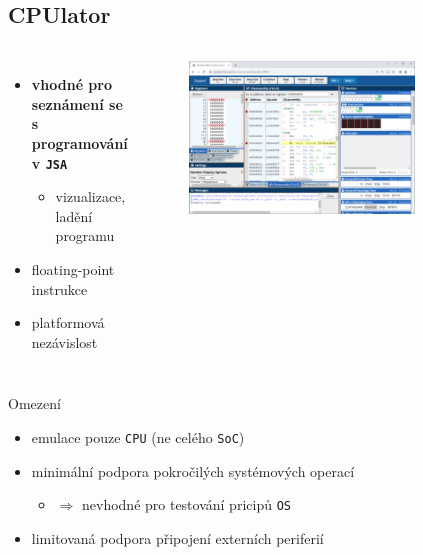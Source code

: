 \documentclass[compress]{beamer}
\begin{document}
\subsection{CPUlator}

\begin{frame}
	\begin{columns}
		\begin{itemize}
			\item \textbf{vhodné pro seznámení se s programování v \texttt{JSA}}
			\begin{itemize}
				\item vizualizace, ladění programu
			\end{itemize}
			\item floating-point instrukce
			\item platformová nezávislost
		\end{itemize}
		\begin{figure}
			\centering
			\includegraphics[width=0.8\textwidth]{img/cpulator.png}
			\caption{\href{https://cpulator.01xz.net}{}}
			\label{CPUlator}
		\end{figure}
	\end{columns}
	\noindent\makebox[\linewidth]{\rule{\textwidth}{0.4pt}}
	\begin{block}{Omezení}
		\begin{itemize}
			\item emulace pouze \texttt{CPU} (ne celého \texttt{SoC})
			\item minimální podpora pokročilých systémových operací
			\begin{itemize}
				\item $\Rightarrow$ nevhodné pro testování pricipů \texttt{OS}
			\end{itemize}
			\item limitovaná podpora připojení externích periferií
		\end{itemize}
	\end{block}
\end{frame}
\end{document}
